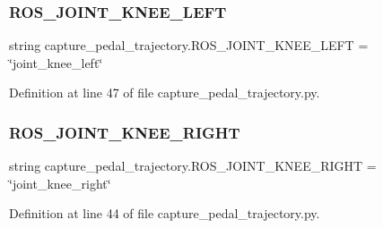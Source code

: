 \subsubsection{\texorpdfstring{ROS\_JOINT\_KNEE\_LEFT}{ROS\_JOINT\_KNEE\_LEFT}}
{\footnotesize\ttfamily string capture\+\_\+pedal\+\_\+trajectory.\+R\+O\+S\+\_\+\+J\+O\+I\+N\+T\+\_\+\+K\+N\+E\+E\+\_\+\+L\+E\+FT = \char`\"{}joint\+\_\+knee\+\_\+left\char`\"{}}



Definition at line 47 of file capture\+\_\+pedal\+\_\+trajectory.\+py.

\mbox{\label{namespacecapture__pedal__trajectory_a79c63fa5ca37fc7f030568dfe7079f73}} 
\subsubsection{\texorpdfstring{ROS\_JOINT\_KNEE\_RIGHT}{ROS\_JOINT\_KNEE\_RIGHT}}
{\footnotesize\ttfamily string capture\+\_\+pedal\+\_\+trajectory.\+R\+O\+S\+\_\+\+J\+O\+I\+N\+T\+\_\+\+K\+N\+E\+E\+\_\+\+R\+I\+G\+HT = \char`\"{}joint\+\_\+knee\+\_\+right\char`\"{}}



Definition at line 44 of file capture\+\_\+pedal\+\_\+trajectory.\+py.

